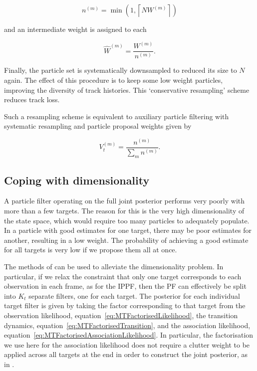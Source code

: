 \begin{equation}
n^{(m)} = \min(1,\left\lceil N W^{(m)} \right\rceil)
\end{equation}

and an intermediate weight is assigned to each

\begin{equation}
\hat{W}^{(m)} = \frac{W^{(m)}}{n^{(m)}}.
\end{equation}

Finally, the particle set is systematically downsampled to reduced its size to $N$ again. The effect of this procedure is to keep some low weight particles, improving the diversity of track histories. This `conservative resampling' scheme reduces track loss.

Such a resampling scheme is equivalent to auxiliary particle filtering with systematic resampling and particle proposal weights given by

\begin{equation}
V_t^{(m)} = \frac{n^{(m)}}{\sum_m n^{(m)}}.
\end{equation}



\subsection{Coping with dimensionality}
A particle filter operating on the full joint posterior performs very poorly with more than a few targets. The reason for this is the very high dimensionality of the state space, which would require too many particles to adequately populate. In a particle with good estimates for one target, there may be poor estimates for another, resulting in a low weight. The probability of achieving a good estimate for all targets is very low if we propose them all at once.

The methods of \cite{Vermaak2005} can be used to alleviate the dimensionality problem. In particular, if we relax the constraint that only one target corresponds to each observation in each frame, as for the IPPF, then the PF can effectively be split into $K_t$ separate filters, one for each target. The posterior for each individual target filter is given by taking the factor corresponding to that target from the observation likelihood, equation~\ref{eq:MTFactorisedLikelihood}, the transition dynamics, equation~\ref{eq:MTFactorisedTransition}, and the association likelihood, equation~\ref{eq:MTFactorisedAssociationLikelihood}. In particular, the factorisation we use here for the association likelihood does not require a clutter weight to be applied across all targets at the end in order to construct the joint posterior, as in \cite{Vermaak2005}.

